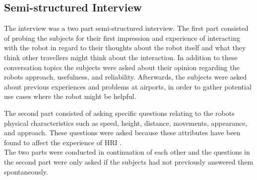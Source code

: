 \subsection{Semi-structured Interview}
The interview was a two part semi-structured interview. The first part consisted of probing the subjects for their first impression and experience of interacting with the robot in regard to their thoughts about the robot itself and what they think other travellers might think about the interaction. In addition to these conversation topics the subjects were asked about their opinion regarding the robots approach, usefulness, and reliability. Afterwards, the subjects were asked about previous experiences and problems at airports, in order to gather potential use cases where the robot might be helpful. 


%
%
The second part consisted of asking specific questions relating to the robots physical characteristics such as speed, height, distance, movements, appearance, and approach. These questions were asked because these attributes have been found to affect the experience of HRI \cite{PDF:HowMayIServeYou}.\\

The two parts were conducted in continuation of each other and the questions in the second part were only asked if the subjects had not previously answered them spontaneously.
 
